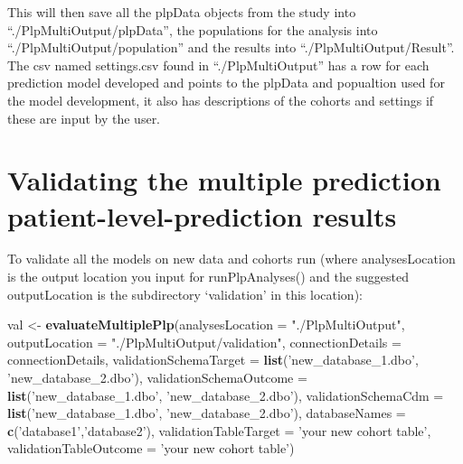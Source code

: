 \documentclass[]{article}
\newenvironment{Shaded}{\begin{snugshade}}{\end{snugshade}}
\newcommand{\KeywordTok}[1]{\textcolor[rgb]{0.13,0.29,0.53}{\textbf{#1}}}
\newcommand{\DataTypeTok}[1]{\textcolor[rgb]{0.13,0.29,0.53}{#1}}
\newcommand{\StringTok}[1]{\textcolor[rgb]{0.31,0.60,0.02}{#1}}
\newcommand{\NormalTok}[1]{#1}
\begin{document}
This will then save all the plpData objects from the study into
``./PlpMultiOutput/plpData'', the populations for the analysis into
``./PlpMultiOutput/population'' and the results into
``./PlpMultiOutput/Result''. The csv named settings.csv found in
``./PlpMultiOutput'' has a row for each prediction model developed and
points to the plpData and popualtion used for the model development, it
also has descriptions of the cohorts and settings if these are input by
the user.

\section{Validating the multiple prediction patient-level-prediction
results}\label{validating-the-multiple-prediction-patient-level-prediction-results}

To validate all the models on new data and cohorts run (where
analysesLocation is the output location you input for runPlpAnalyses()
and the suggested outputLocation is the subdirectory `validation' in
this location):

\begin{Shaded}
\begin{Highlighting}[]
\NormalTok{val <-}\StringTok{ }\KeywordTok{evaluateMultiplePlp}\NormalTok{(}\DataTypeTok{analysesLocation =} \StringTok{"./PlpMultiOutput"}\NormalTok{,}
                                \DataTypeTok{outputLocation =} \StringTok{"./PlpMultiOutput/validation"}\NormalTok{,}
                                \DataTypeTok{connectionDetails =}\NormalTok{ connectionDetails, }
                                \DataTypeTok{validationSchemaTarget =} \KeywordTok{list}\NormalTok{(}\StringTok{'new_database_1.dbo'}\NormalTok{,}
                                                              \StringTok{'new_database_2.dbo'}\NormalTok{),}
                                \DataTypeTok{validationSchemaOutcome =} \KeywordTok{list}\NormalTok{(}\StringTok{'new_database_1.dbo'}\NormalTok{,}
                                                              \StringTok{'new_database_2.dbo'}\NormalTok{),}
                                \DataTypeTok{validationSchemaCdm =} \KeywordTok{list}\NormalTok{(}\StringTok{'new_database_1.dbo'}\NormalTok{,}
                                                              \StringTok{'new_database_2.dbo'}\NormalTok{), }
                                \DataTypeTok{databaseNames =} \KeywordTok{c}\NormalTok{(}\StringTok{'database1'}\NormalTok{,}\StringTok{'database2'}\NormalTok{),}
                                \DataTypeTok{validationTableTarget =} \StringTok{'your new cohort table'}\NormalTok{,}
                                \DataTypeTok{validationTableOutcome =} \StringTok{'your new cohort table'}\NormalTok{)}
\end{Highlighting}
\end{Shaded}
\end{document}

